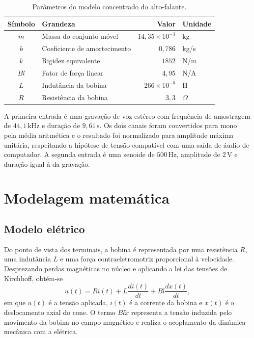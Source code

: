 \documentclass[11pt,letterpaper]{article}
\begin{document}
\begin{table}[H]
  \centering
  \caption{Parâmetros do modelo concentrado do alto-falante.}
  \label{tab:parametros}
  \begin{tabular}{clrl}
    \toprule
    Símbolo & Grandeza & Valor & Unidade \\
    \midrule
    $m$  & Massa do conjunto móvel       & $14{,}35\times10^{-3}$ & kg \\
    $b$  & Coeficiente de amortecimento  & $0{,}786$               & kg/s \\
    $k$  & Rigidez equivalente           & $1852$                  & N/m \\
    $Bl$ & Fator de força linear         & $4{,}95$                & N/A \\
    $L$  & Indutância da bobina          & $266\times10^{-6}$      & H \\
    $R$  & Resistência da bobina         & $3{,}3$                 & $\Omega$ \\
    \bottomrule
  \end{tabular}
\end{table}

A primeira entrada é uma gravação de voz estéreo com frequência de amostragem de
$44{,}1\,\mathrm{kHz}$ e duração de $9{,}61\,\mathrm{s}$. Os dois canais foram convertidos para mono
pela média aritmética e o resultado foi normalizado para amplitude máxima unitária, respeitando a
hipótese de tensão compatível com uma saída de áudio de computador. A segunda entrada é uma
senoide de $500\,\mathrm{Hz}$, amplitude de $2\,\mathrm{V}$ e duração igual à da gravação.

\section{Modelagem matemática}

\subsection{Modelo elétrico}

Do ponto de vista dos terminais, a bobina é representada por uma resistência $R$, uma indutância
$L$ e uma força contraeletromotriz proporcional à velocidade. Desprezando perdas magnéticas no
núcleo e aplicando a lei das tensões de Kirchhoff, obtém-se
\begin{equation}
  u(t)=Ri(t)+L\frac{di(t)}{dt}+Bl\frac{dx(t)}{dt},
  \label{eq:eletrica}
\end{equation}
em que $u(t)$ é a tensão aplicada, $i(t)$ é a corrente da bobina e $x(t)$ é o deslocamento axial do
cone. O termo $Bl\dot{x}$ representa a tensão induzida pelo movimento da bobina no campo
magnético e realiza o acoplamento da dinâmica mecânica com a elétrica.
\end{document}
